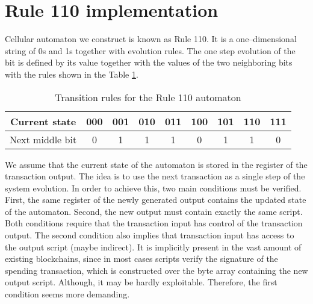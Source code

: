 \documentclass[runningheads]{llncs}
\begin{document}
    \section{Rule 110 implementation}
    Cellular automaton we construct is known as Rule 110.
    It is a one--dimensional string of 0s and 1s together with evolution rules.
    The one step evolution of the bit is defined by its value together with the
    values of the two neighboring bits with the rules shown in the Table
    \ref{tab:transitions}.
    \begin{table}
        \caption{Transition rules for the Rule 110 automaton}
        \label{tab:transitions}
        \centering
        \begin{tabular} {| *{9}{c|} }
            \hline            
            Current state & 000 & 001 & 010 & 011 & 100 & 101 & 110 & 111 \\ \hline
            Next middle bit    & 0 & 1 & 1 & 1 & 0 & 1 & 1 & 0 \\ 
            \hline  
        \end{tabular}
    \end{table}
    We assume that the current state of the automaton is stored in the register
    of the transaction output. The idea is to use the next transaction as a single
    step of the system evolution. In order to achieve this, two main conditions must
    be verified. First, the same register of the newly generated output contains
    the updated state of the automaton. Second, the new output must contain
    exactly the same script. Both conditions require that the transaction input has
    control of the transaction output. The second condition also implies that
    transaction input has access to the output script (maybe indirect). It is
    implicitly present in the vast amount of existing blockchains, since in most
    cases scripts verify the signature of the spending transaction, which is
    constructed over the byte array containing the new output script. Although, it
    may be hardly exploitable. Therefore, the first condition seems more demanding.
\end{document}

